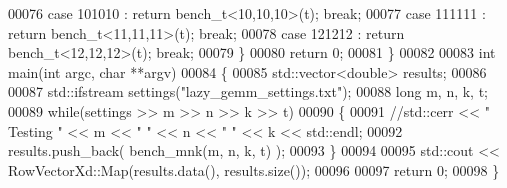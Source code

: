 \begin{DoxyCode}
00076     \textcolor{keywordflow}{case} 101010 : \textcolor{keywordflow}{return} bench\_t<10,10,10>(t); \textcolor{keywordflow}{break};
00077     \textcolor{keywordflow}{case} 111111 : \textcolor{keywordflow}{return} bench\_t<11,11,11>(t); \textcolor{keywordflow}{break};
00078     \textcolor{keywordflow}{case} 121212 : \textcolor{keywordflow}{return} bench\_t<12,12,12>(t); \textcolor{keywordflow}{break};
00079   \}
00080   \textcolor{keywordflow}{return} 0;
00081 \}
00082 
00083 \textcolor{keywordtype}{int} main(\textcolor{keywordtype}{int} argc, \textcolor{keywordtype}{char} **argv)
00084 \{
00085   std::vector<double> results;
00086   
00087   std::ifstream settings(\textcolor{stringliteral}{"lazy\_gemm\_settings.txt"});
00088   \textcolor{keywordtype}{long} m, n, k, t;
00089   \textcolor{keywordflow}{while}(settings >> m >> n >> k >> t)
00090   \{
00091     \textcolor{comment}{//std::cerr << "  Testing " << m << " " << n << " " << k << std::endl;}
00092     results.push\_back( bench\_mnk(m, n, k, t) );
00093   \}
00094   
00095   std::cout << RowVectorXd::Map(results.data(), results.size());
00096   
00097   \textcolor{keywordflow}{return} 0;
00098 \}
\end{DoxyCode}
